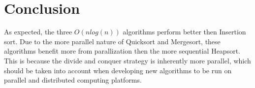 \documentclass[conference]{IEEEtran}
\begin{document}
\section{Conclusion}
As expected, the three $O(n log(n))$ algorithms perform better then Insertion sort. 
Due to the more parallel nature of Quicksort and Mergesort, these algorithms benefit more from parallization then the more sequential Heapsort. 
This is because the divide and conquer strategy is inherently more parallel, which should be taken into account when developing new algorithms to be run on parallel and distributed computing platforms. 


\appendix
\end{document}
